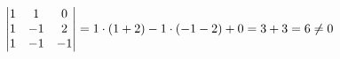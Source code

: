 \documentclass[preview]{standalone}
\begin{document}
\begin{align*}
\special{dvisvgm:raw <g id='unique000'>}\begin{vmatrix}1&1&0\\1&-1&2\\1&-1&-1\end{vmatrix}=1\cdot(1+2)-1\cdot(-1-2)+0=3+3=6\ne 0\special{dvisvgm:raw </g>}
\end{align*}
\end{document}
